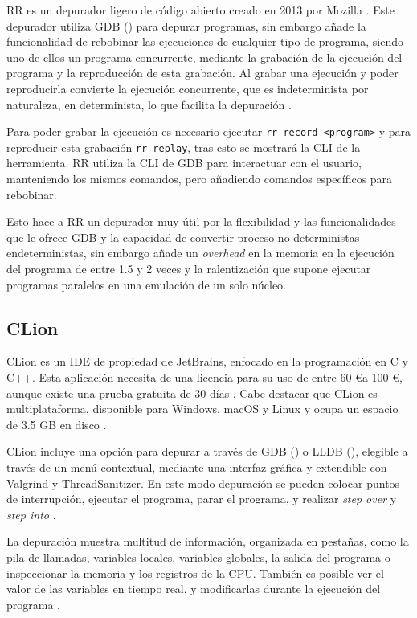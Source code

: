 RR es un \gls{depurador} ligero de \gls{código abierto} creado en 2013 por Mozilla \cite{RRWiki}. Este depurador utiliza GDB () para \gls{depurar} programas, sin embargo añade la funcionalidad de rebobinar las ejecuciones de cualquier tipo de programa, siendo uno de ellos un \gls{programa concurrente}, mediante la grabación de la ejecución del programa y la reproducción de esta grabación. Al grabar una ejecución y poder reproducirla convierte la ejecución concurrente, que es \gls{indeterminista} por naturaleza, en \gls{determinista}, lo que facilita la depuración \cite{RR}.

Para poder grabar la ejecución es necesario ejecutar \texttt{rr record <program>} y para reproducir esta grabación \texttt{rr replay}, tras esto se mostrará la \gls{CLI} de la herramienta. RR utiliza la \gls{CLI} de GDB para interactuar con el usuario, manteniendo los mismos comandos, pero añadiendo comandos específicos para rebobinar.

Esto hace a RR un \gls{depurador} muy útil por la flexibilidad y las funcionalidades que le ofrece GDB y la capacidad de convertir \gls{proceso} no deterministas en\glspl{determinista}, sin embargo añade un \textit{\gls{overhead}} en la memoria en la ejecución del programa de entre 1.5 y 2 veces y la ralentización que supone ejecutar programas paralelos en una emulación de un solo núcleo\cite{RR}.

\subsection{CLion}{\label{subsec:clion}}
CLion es un \gls{IDE} de propiedad de JetBrains, enfocado en la programación en C y C++. Esta aplicación necesita de una licencia para su uso de entre 60 \euro a 100 \euro, aunque existe una prueba gratuita de 30 días \cite{ClionPrizing}. Cabe destacar que CLion es multiplataforma, disponible para Windows, macOS y Linux y ocupa un espacio de 3.5 GB en disco \cite{ClionDownload}.

CLion incluye una opción para depurar a través de GDB () o LLDB (), elegible a través de un menú contextual, mediante una \gls{interfaz gráfica} y extendible con Valgrind y ThreadSanitizer. En este modo depuración se pueden colocar puntos de interrupción, ejecutar el programa, parar el programa, y realizar \textit{\gls{step over}} y \textit{\gls{step into}} \cite{ClionDebugger}.

La depuración muestra multitud de información, organizada en pestañas, como la pila de llamadas, variables locales, variables globales, la salida del programa o inspeccionar la memoria y los \gls{registros} de la \gls{CPU}. También es posible ver el valor de las variables en tiempo real, y modificarlas durante la ejecución del programa \cite{ClionDebuggerToolWindow}.

